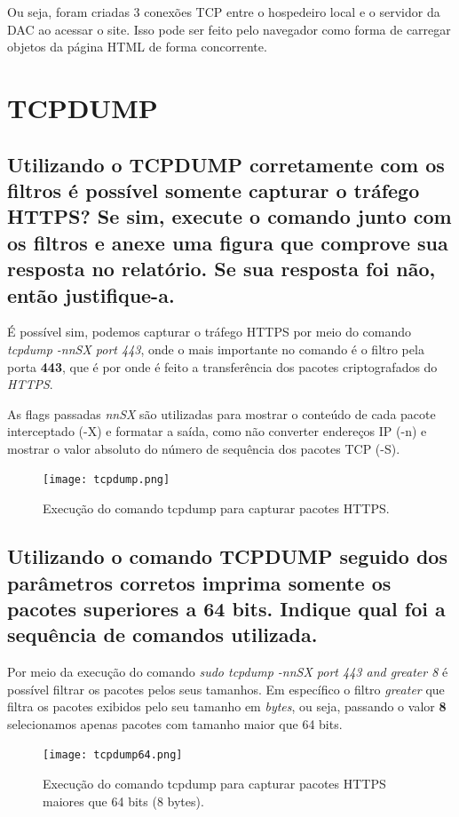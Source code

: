 \documentclass[12pt,a4paper]{report}
\begin{document}
Ou seja, foram criadas 3 conexões TCP entre o hospedeiro local e o servidor da DAC ao acessar o site. Isso pode ser feito pelo navegador como forma de carregar objetos da página HTML de forma concorrente.

\section{TCPDUMP}
\subsection{Utilizando o TCPDUMP corretamente com os filtros é possível somente capturar o tráfego HTTPS? Se sim, execute o comando junto com os filtros e anexe uma figura que comprove sua resposta no relatório. Se sua resposta foi não, então justifique-a.}

É possível sim, podemos capturar o tráfego HTTPS por meio do comando \emph{tcpdump -nnSX port 443}, onde o mais importante no comando é o filtro pela porta \textbf{443}, que é por onde é feito a transferência dos pacotes criptografados do \emph{HTTPS}.

As flags passadas \emph{nnSX} são utilizadas para mostrar o conteúdo de cada pacote interceptado (-X) e formatar a saída, como não converter endereços IP (-n) e mostrar o valor absoluto do número de sequência dos pacotes TCP (-S).

\begin{figure}[H]
        \texttt{[image: tcpdump.png]}
        \caption{Execução do comando tcpdump para capturar pacotes HTTPS.}
\end{figure}

\subsection{Utilizando o comando TCPDUMP seguido dos parâmetros corretos imprima somente os pacotes superiores a 64 bits. Indique qual foi a sequência de comandos utilizada.}

Por meio da execução do comando \emph{sudo tcpdump -nnSX port 443 and greater 8} é possível filtrar os pacotes pelos seus tamanhos. Em específico o filtro \emph{greater} que filtra os pacotes exibidos pelo seu tamanho em \emph{bytes}, ou seja, passando o valor \textbf{8} selecionamos apenas pacotes com tamanho maior que 64 bits.

\begin{figure}[H]
        \texttt{[image: tcpdump64.png]}
        \caption{Execução do comando tcpdump para capturar pacotes HTTPS maiores que 64 bits (8 bytes).}
\end{figure}
\end{document}
